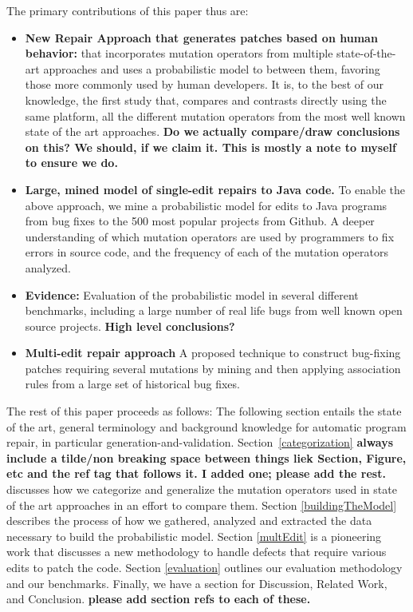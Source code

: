 \documentclass[conference]{IEEEtran}
\newcommand{\todo}[1]
  {{\scriptsize \textbf{\color{red} {#1}}}}
\begin{document}
The primary contributions of this paper thus are:
\begin{itemize}
  \item \textbf{New Repair Approach that generates patches based on human behavior:} that incorporates mutation operators
    from multiple state-of-the-art approaches and 
    uses a probabilistic model to between them, favoring those more commonly
    used by human developers. It is, to the best of our
    knowledge, the first study that, compares and contrasts directly using the
    same platform, all the different mutation operators from the most well known
    state of the art approaches.  \todo{Do we actually compare/draw conclusions
      on this?  We should, if we claim it.  This is mostly a note to myself to
      ensure we do.} 
    \item \textbf{Large, mined model of single-edit repairs to Java code.} To
      enable the above approach, we mine a probabilistic model for edits to Java programs
    from bug fixes to the 500 most popular projects from
    Github.   A deeper
    understanding of which mutation operators are used by programmers to fix
    errors in source code, and the frequency of each of the mutation operators
    analyzed. 
  \item \textbf{Evidence:} Evaluation of the probabilistic model in several
    different benchmarks, including a large number of real life bugs from well
    known open source projects.  \todo{High level conclusions?}
  \item \textbf{Multi-edit repair approach} A proposed technique to construct 
    bug-fixing patches requiring several mutations by mining and then applying association
    rules from a large set of historical bug fixes. 
\end{itemize}

The rest of this paper proceeds as follows:
The following section entails the state of the art, general terminology and
background knowledge for automatic program repair, in particular
generation-and-validation. Section~\ref{categorization} \todo{always include a
  tilde/non breaking space between things liek Section, Figure, etc and the ref
  tag that follows it.  I added one; please add the rest.} discusses how we
categorize and generalize the mutation operators used in state of the art
approaches in an effort to compare them. Section \ref{buildingTheModel}
describes the process of how we gathered, analyzed and extracted the data
necessary to build the probabilistic model. Section \ref{multEdit} is a
pioneering work that discusses a new methodology to handle defects that require
various edits to patch the code. Section \ref{evaluation} outlines our
evaluation methodology and our benchmarks.  Finally, we have a section for
Discussion, Related Work, and Conclusion. \todo{please add section refs to each
  of these.}
\end{document}
